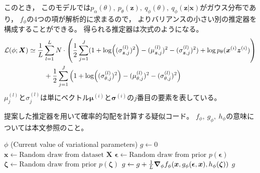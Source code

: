 \documentclass[dvipdfmx, fleqn]{jsarticle}
\begin{document}
このとき，
このモデルでは\(p_{\alpha} (\theta),\ p_{\theta} (\bm{z}),\ q_{\phi} (\theta),\ q_{\phi} (\bm{z} | \bm{x})\)がガウス分布であり，
\(f_{\phi}\)の4つの項が解析的に求まるので，
よりバリアンスの小さい別の推定器を構成することができる。
得られる推定器は次式のようになる。
\begin{align}
    \mathcal{L}(\phi; \bm{X})
        & \simeq \frac{1}{L} \sum_{l=1}^{L} N \cdot \qty(
            \frac{1}{2} \sum_{j=1}^{J} (1 + \log((\sigma_{\bm{z}, j}^{(l)})^2) - (\mu_{\bm{z}, j}^{(l)})^2 - (\sigma_{\bm{z}, j}^{(l)})^2)
            + \log{p_{\theta} (\bm{x}^{(i)} \bm{z}^{(i)})}
            )
        \notag \\
        & \ \qquad
            + \frac{1}{2} \sum_{j=1}^{J} \qty(1 + \log((\sigma_{\theta, j}^{(l)})^2) - (\mu_{\theta, j}^{(l)})^2 - (\sigma_{\theta, j}^{(l)})^2)
\end{align}
\(\mu_j^{(l)}\)と\(\sigma_j^{(l)}\)は単にベクトル\(\bm{\mu}^{(i)}\)と\(\bm{\sigma}^{(i)}\)の\(j\)番目の要素を表している。


\begin{algorithm}
    \caption{
        提案した推定器を用いて確率的勾配を計算する疑似コード。
        \(f_{\phi},\ g_{\phi},\ h_{\phi}\)の意味については本文参照のこと。
        }
    \label{algo:pseudo_SGD}
    \begin{algorithmic}
        \REQUIRE \(\phi\) (Current value of variational parameters)
        \STATE \(g \leftarrow 0\)
            \STATE \(\bm{x} \leftarrow \text{Random draw from dataset } \bm{X}\)
            \STATE \(\bm{\epsilon} \leftarrow \text{Random draw from prior } p(\bm{\epsilon})\)
            \STATE \(\bm{\zeta} \leftarrow \text{Random draw from prior } p(\bm{\zeta})\)
            \STATE \(g \leftarrow g + \frac{1}{L} \grad_{\phi} f_{\phi} (\bm{x}, g_{\phi} (\bm{\epsilon}, \bm{x}), h_{\phi} (\bm{\zeta})) \)
        \ENDFOR
        \RETURN \(g\)
    \end{algorithmic}
\end{algorithm}
\end{document}
